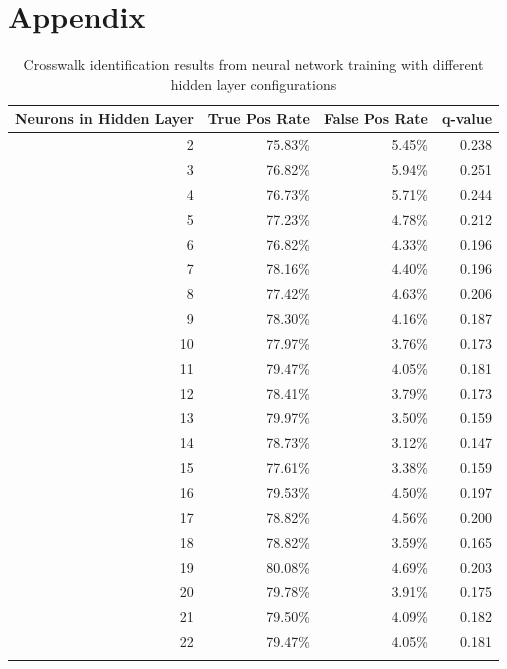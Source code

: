 \documentclass[12pt]{ucthesis}
\begin{document}

\clearpage



\chapter{Appendix}

    \begin{longtable}{|r|r|r|r|}
    \hline
    Neurons in Hidden Layer & True Pos Rate & False Pos Rate & q-value \bigstrut\\
    \hline
    2     & 75.83\% & 5.45\% & 0.238 \bigstrut\\
    \hline
    3     & 76.82\% & 5.94\% & 0.251 \bigstrut\\
    \hline
    4     & 76.73\% & 5.71\% & 0.244 \bigstrut\\
    \hline
    5     & 77.23\% & 4.78\% & 0.212 \bigstrut\\
    \hline
    6     & 76.82\% & 4.33\% & 0.196 \bigstrut\\
    \hline
    7     & 78.16\% & 4.40\% & 0.196 \bigstrut\\
    \hline
    8     & 77.42\% & 4.63\% & 0.206 \bigstrut\\
    \hline
    9     & 78.30\% & 4.16\% & 0.187 \bigstrut\\
    \hline
    10    & 77.97\% & 3.76\% & 0.173 \bigstrut\\
    \hline
    11    & 79.47\% & 4.05\% & 0.181 \bigstrut\\
    \hline
    12    & 78.41\% & 3.79\% & 0.173 \bigstrut\\
    \hline
    13    & 79.97\% & 3.50\% & 0.159 \bigstrut\\
    \hline
    14    & 78.73\% & 3.12\% & 0.147 \bigstrut\\
    \hline
    15    & 77.61\% & 3.38\% & 0.159 \bigstrut\\
    \hline
    16    & 79.53\% & 4.50\% & 0.197 \bigstrut\\
    \hline
    17    & 78.82\% & 4.56\% & 0.200 \bigstrut\\
    \hline
    18    & 78.82\% & 3.59\% & 0.165 \bigstrut\\
    \hline
    19    & 80.08\% & 4.69\% & 0.203 \bigstrut\\
    \hline
    20    & 79.78\% & 3.91\% & 0.175 \bigstrut\\
    \hline
    21    & 79.50\% & 4.09\% & 0.182 \bigstrut\\
    \hline
    22    & 79.47\% & 4.05\% & 0.181 \bigstrut\\
    \hline

    \caption{Crosswalk identification results from neural network training with different hidden layer configurations}
    \label{tab:NN-HiddenLayersResultsAPP} 
    \end{longtable}
\end{document}
